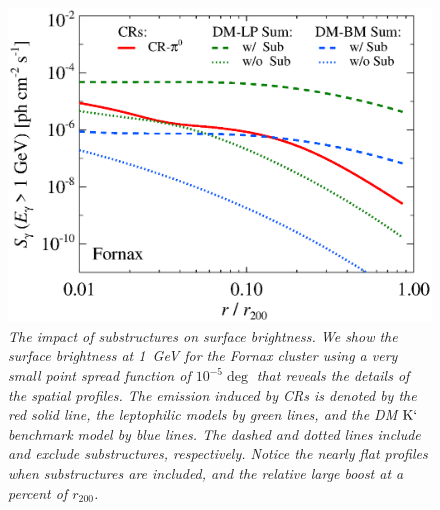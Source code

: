 \documentclass[10pt,aps,pra,reprint,amsmath,amsfonts,amssymb,showpacs]{revtex4-1}
\newcommand{\rmn}{\mathrm}
\newcommand{\rvir}{r_{200}}
\newcommand{\Km}{\rmn{K}`}
\begin{document}
\begin{figure}%
 \includegraphics[width=0.99\columnwidth]{figures/SB.resolved.v8.1GeV.SF300.noSuB.vs.SubMass.elmu.eps}
\caption{\it The impact of substructures on surface brightness. We
  show the surface brightness at 1~GeV for the Fornax cluster using a
  very small point spread function of $10^{-5}\deg$ that reveals the
  details of the spatial profiles. The emission induced by CRs is
  denoted by the red solid line, the leptophilic models by green
  lines, and the DM $\Km$ benchmark model by blue lines. The dashed
  and dotted lines include and exclude substructures,
  respectively. Notice the nearly flat profiles when substructures are
  included, and the relative large boost at a percent of $\rvir$.}
 \label{fig11}
\end{figure}
\end{document}
